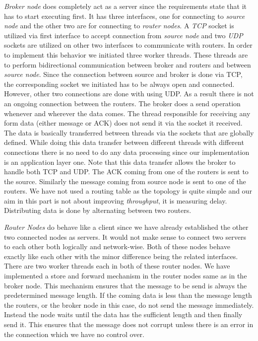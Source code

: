 \documentclass[conference]{IEEEtran}
\begin{document}
\par \textit{Broker node} does completely act as a server since the requirements state that it has to start executing first. It has three interfaces, one for connecting to \textit{source node} and the other two are for connecting to \textit{router nodes}. A \textit{TCP} socket is utilized via first interface to accept connection from \textit{source node} and two \textit{UDP} sockets are utilized on other two interfaces to communicate with routers. In order to implement this behavior we initiated three worker threads. These threads are to perform bidirectional communication between broker and routers and between \textit{source node}. Since the connection between source and broker is done via TCP, the corresponding socket we initiated has to be always open and connected. However, other two connections are done with using UDP. As a result there is not an ongoing connection between the routers. The broker does a send operation whenever and wherever the data comes. The thread responsible for receiving any form data (either message or ACK) does not send it via the socket it received. The data is basically transferred between threads via the sockets that are globally defined. While doing this data transfer between different threads with different connections there is no need to do any data processing since our implementation is an application layer one. Note that this data transfer allows the broker to handle both TCP and UDP. The ACK coming from one of the routers is sent to the source. Similarly the message coming from source node is sent to one of the routers. We have not used a routing table as the topology is quite simple and our aim in this part is not about improving \textit{throughput}, it is measuring delay. Distributing data is done by alternating between two routers. 

\par \textit{Router Nodes} do behave like a client since we have already established the other two connected nodes as servers. It would not make sense to connect two servers to each other both logically and network-wise. Both of these nodes behave exactly like each other with the minor difference being the related interfaces. There are two worker threads each in both of these router nodes. We have implemented a store and forward mechanism in the router nodes same as in the broker node. This mechanism ensures that the message to be send is always the predetermined message length. If the coming data is less than the message length the routers, or the broker node in this case, do not send the message immediately. Instead the node waits until the data has the sufficient length and then finally send it. This ensures that the message does not corrupt unless there is an error in the connection which we have no control over. 
\end{document}
